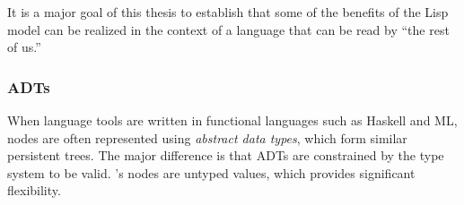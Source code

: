 It is a major goal of this thesis to establish that some of the benefits of the Lisp model can be realized in the context of a language that can be read by ``the rest of us.''

\subsubsection{ADTs}
When language tools are written in functional languages such as Haskell and ML, nodes are often represented using \emph{abstract data types}\cite{functionalAST}, which form similar persistent trees. The major difference is that ADTs are constrained by the type system to be valid. \Meta's nodes are untyped values, which provides significant flexibility.


